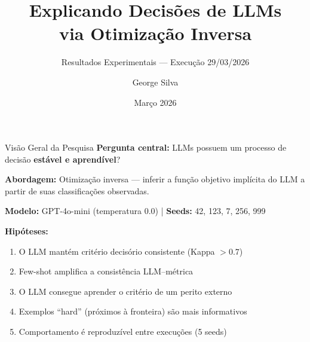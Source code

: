 \documentclass[aspectratio=169,11pt]{beamer}
\title{Explicando Decis\~oes de LLMs\\via Otimiza\c{c}\~ao Inversa}
\subtitle{Resultados Experimentais --- Execu\c{c}\~ao 29/03/2026}
\author{George Silva}
\date{Mar\c{c}o 2026}
\begin{document}
\begin{frame}
\titlepage
\end{frame}

\begin{frame}{Vis\~ao Geral da Pesquisa}
\textbf{Pergunta central:} LLMs possuem um processo de decis\~ao \textbf{est\'avel e aprend\'ivel}?

\vspace{0.3cm}
\textbf{Abordagem:} Otimiza\c{c}\~ao inversa --- inferir a fun\c{c}\~ao objetivo impl\'icita do LLM a partir de suas classifica\c{c}\~oes observadas.

\vspace{0.3cm}
\textbf{Modelo:} GPT-4o-mini (temperatura 0.0) \quad | \quad \textbf{Seeds:} 42, 123, 7, 256, 999

\vspace{0.3cm}
\textbf{Hip\'oteses:}
\begin{enumerate}
    \item[\textbf{H1}] O LLM mant\'em crit\'erio decis\'orio consistente (Kappa $> 0.7$)
    \item[\textbf{H2}] Few-shot amplifica a consist\^encia LLM--m\'etrica
    \item[\textbf{H3}] O LLM consegue aprender o crit\'erio de um perito externo
    \item[\textbf{H4}] Exemplos ``hard'' (pr\'oximos \`a fronteira) s\~ao mais informativos
    \item[\textbf{H5}] Comportamento \'e reproduz\'ivel entre execu\c{c}\~oes (5 seeds)
\end{enumerate}
\end{frame}
\end{document}
